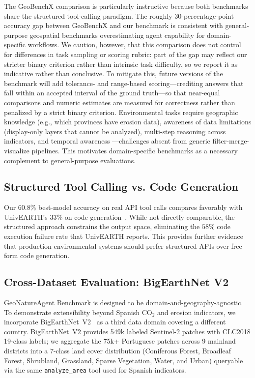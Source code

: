 \documentclass[sigconf]{acmart}
\begin{document}
The GeoBenchX comparison is particularly instructive because both benchmarks share the structured tool-calling paradigm. The roughly 30-percentage-point accuracy gap between GeoBenchX and our benchmark is consistent with general-purpose geospatial benchmarks overestimating agent capability for domain-specific workflows. We caution, however, that this comparison does not control for differences in task sampling or scoring rubric: part of the gap may reflect our stricter binary criterion rather than intrinsic task difficulty, so we report it as indicative rather than conclusive. To mitigate this, future versions of the benchmark will add tolerance- and range-based scoring---crediting answers that fall within an accepted interval of the ground truth---so that near-equal comparisons and numeric estimates are measured for correctness rather than penalized by a strict binary criterion. Environmental tasks require geographic knowledge (e.g., which provinces have erosion data), awareness of data limitations (display-only layers that cannot be analyzed), multi-step reasoning across indicators, and temporal awareness ---challenges absent from generic filter-merge-visualize pipelines. This motivates domain-specific benchmarks as a necessary complement to general-purpose evaluations.

\subsection{Structured Tool Calling vs. Code Generation}

Our $60.8\%$ best-model accuracy on real API tool calls compares favorably with UnivEARTH's $33\%$ on code generation~\citep{kao2025univearth}. While not directly comparable, the structured approach constrains the output space, eliminating the $58\%$ code execution failure rate that UnivEARTH reports. This provides further evidence that production environmental systems should prefer structured APIs over free-form code generation.

\subsection{Cross-Dataset Evaluation: BigEarthNet V2}
\label{sec:validation}

GeoNatureAgent Benchmark is designed to be domain-and-geogra\-phy-agnostic. To demonstrate extensibility beyond Spanish CO$_2$ and erosion indicators, we incorporate BigEarthNet~V2~\citep{clasen2024reben} as a third data domain covering a different country. BigEarthNet~V2 provides 549k labeled Sentinel-2 patches with CLC2018 19-class labels; we aggregate the 75k+ Portuguese patches across 9 mainland districts into a 7-class land cover distribution (Coniferous Forest, Broadleaf Forest, Shrubland, Grassland, Sparse Vegetation, Water, and Urban) queryable via the same \texttt{analyze\_area} tool used for Spanish indicators.
\end{document}
